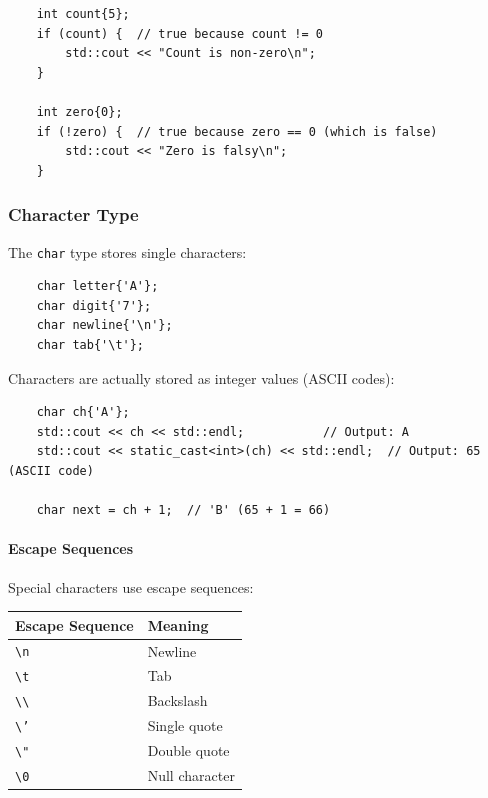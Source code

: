 \begin{lstlisting}
	int count{5};
	if (count) {  // true because count != 0
		std::cout << "Count is non-zero\n";
	}
	
	int zero{0};
	if (!zero) {  // true because zero == 0 (which is false)
		std::cout << "Zero is falsy\n";
	}
\end{lstlisting}

\subsubsection{Character Type}

The \texttt{char} type stores single characters:

\begin{lstlisting}
	char letter{'A'};
	char digit{'7'};
	char newline{'\n'};
	char tab{'\t'};
\end{lstlisting}

Characters are actually stored as integer values (ASCII codes):

\begin{lstlisting}
	char ch{'A'};
	std::cout << ch << std::endl;           // Output: A
	std::cout << static_cast<int>(ch) << std::endl;  // Output: 65 (ASCII code)
	
	char next = ch + 1;  // 'B' (65 + 1 = 66)
\end{lstlisting}

\paragraph{Escape Sequences}

Special characters use escape sequences:

\begin{center}
	\begin{tabular}{|l|l|}
		\hline
		\textbf{Escape Sequence} & \textbf{Meaning} \\
		\hline
		\texttt{\textbackslash n} & Newline \\
		\texttt{\textbackslash t} & Tab \\
		\texttt{\textbackslash \textbackslash} & Backslash \\
		\texttt{\textbackslash '} & Single quote \\
		\texttt{\textbackslash "} & Double quote \\
		\texttt{\textbackslash 0} & Null character \\
		\hline
	\end{tabular}
\end{center}

